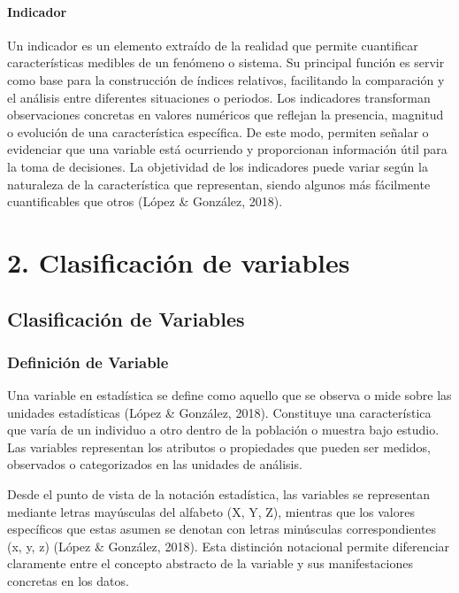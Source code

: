 \documentclass[
  spanish,
  letterpaper,
]{book}
\begin{document}
\subsection{Indicador}\label{indicador}

Un indicador es un elemento extraído de la realidad que permite
cuantificar características medibles de un fenómeno o sistema. Su
principal función es servir como base para la construcción de índices
relativos, facilitando la comparación y el análisis entre diferentes
situaciones o periodos. Los indicadores transforman observaciones
concretas en valores numéricos que reflejan la presencia, magnitud o
evolución de una característica específica. De este modo, permiten
señalar o evidenciar que una variable está ocurriendo y proporcionan
información útil para la toma de decisiones. La objetividad de los
indicadores puede variar según la naturaleza de la característica que
representan, siendo algunos más fácilmente cuantificables que otros
(López \& González, 2018).

\part{2. Clasificación de variables}


\chapter{Clasificación de
Variables}\label{clasificaciuxf3n-de-variables-1}

\section{Definición de Variable}\label{definiciuxf3n-de-variable}

Una variable en estadística se define como aquello que se observa o mide
sobre las unidades estadísticas (López \& González, 2018). Constituye
una característica que varía de un individuo a otro dentro de la
población o muestra bajo estudio. Las variables representan los
atributos o propiedades que pueden ser medidos, observados o
categorizados en las unidades de análisis.

Desde el punto de vista de la notación estadística, las variables se
representan mediante letras mayúsculas del alfabeto (X, Y, Z), mientras
que los valores específicos que estas asumen se denotan con letras
minúsculas correspondientes (x, y, z) (López \& González, 2018). Esta
distinción notacional permite diferenciar claramente entre el concepto
abstracto de la variable y sus manifestaciones concretas en los datos.
\end{document}
